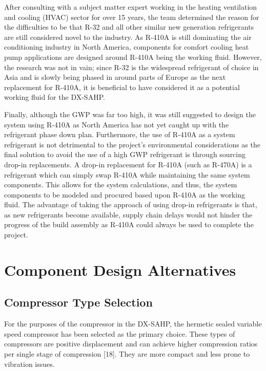 \medskip
After consulting with a subject matter expert working in the heating ventilation and cooling (HVAC) sector for over 15 years, the team determined the reason for the difficulties to be that R-32 and all other similar new generation refrigerants are still considered novel to the industry. As R-410A is still dominating the air conditioning industry in North America, components for comfort cooling heat pump applications are designed around R-410A being the working fluid. However, the research was not in vain; since R-32 is the widespread refrigerant of choice in Asia and is slowly being phased in around parts of Europe as the next replacement for R-410A, it is beneficial to have considered it as a potential working fluid for the DX-SAHP.

\medskip
Finally, although the GWP was far too high, it was still suggested to design the system using R-410A as North America has not yet caught up with the refrigerant phase down plan. Furthermore, the use of R-410A as a system refrigerant is not detrimental to the project’s environmental considerations as the final solution to avoid the use of a high GWP refrigerant is through sourcing drop-in replacements. A drop-in replacement for R-410A (such as R-470A) is a refrigerant which can simply swap R-410A while maintaining the same system components. This allows for the system calculations, and thus, the system components to be modeled and procured based upon R-410A as the working fluid. The advantage of taking the approach of using drop-in refrigerants is that, as new refrigerants become available, supply chain delays would not hinder the progress of the build assembly as R-410A could always be used to complete the project.

\section{Component Design Alternatives}

\subsection{Compressor Type Selection}

For the purposes of the compressor in the DX-SAHP, the hermetic sealed variable speed compressor has been selected as the primary choice. These types of compressors are positive displacement and can achieve higher compression ratios per single stage of compression [18]. They are more compact and less prone to vibration issues.

